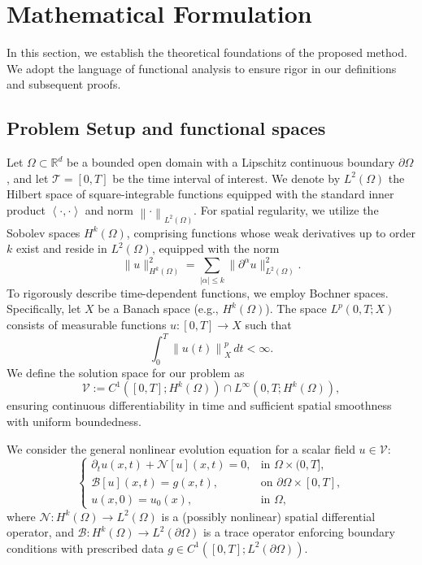 \documentclass[11pt,reqno]{amsart}
\theoremstyle{plain}
\theoremstyle{definition}
\theoremstyle{remark}
\newcommand{\norm}[1]{\left\|#1\right\|}
\newcommand{\inner}[2]{\left\langle #1, #2 \right\rangle}
\begin{document}
\section{Mathematical Formulation}

In this section, we establish the theoretical foundations of the proposed method. We adopt the language of functional analysis to ensure rigor in our definitions and subsequent proofs.

\subsection{Problem Setup and functional spaces}

Let $\Omega \subset \mathbb{R}^d$ be a bounded open domain with a Lipschitz continuous boundary $\partial \Omega$, and let $\mathcal{T} = [0, T]$ be the time interval of interest. We denote by $L^2(\Omega)$ the Hilbert space of square-integrable functions equipped with the standard inner product $\inner{\cdot}{\cdot}$ and norm $\norm{\cdot}_{L^2(\Omega)}$. For spatial regularity, we utilize the Sobolev spaces $H^k(\Omega)$, comprising functions whose weak derivatives up to order $k$ exist and reside in $L^2(\Omega)$, equipped with the norm
\[
\|u\|_{H^k(\Omega)}^2 = \sum_{|\alpha| \leq k} \|\partial^\alpha u\|_{L^2(\Omega)}^2.
\]
To rigorously describe time-dependent functions, we employ Bochner spaces. Specifically, let $X$ be a Banach space (e.g., $H^k(\Omega)$). The space $L^p(0, T; X)$ consists of measurable functions $u: [0, T] \to X$ such that 
\[
\int_0^T \norm{u(t)}_X^p \, dt < \infty.
\]
We define the solution space for our problem as 
\[
\mathcal{V} := C^1([0, T]; H^k(\Omega)) \cap L^\infty(0,T; H^k(\Omega)),
\]
ensuring continuous differentiability in time and sufficient spatial smoothness with uniform boundedness.

\medskip
\noindent We consider the general nonlinear evolution equation for a scalar field $u \in \mathcal{V}$:
\begin{equation} \label{eq:general_pde}
    \begin{cases}
        \partial_t u(x,t) + \mathcal{N}[u](x,t) = 0, & \text{in } \Omega \times (0, T], \\
        \mathcal{B}[u](x,t) = g(x,t), & \text{on } \partial \Omega \times [0, T], \\
        u(x,0) = u_0(x), & \text{in } \Omega,
    \end{cases}
\end{equation}
where $\mathcal{N}: H^k(\Omega) \to L^2(\Omega)$ is a (possibly nonlinear) spatial differential operator, and $\mathcal{B}: H^k(\Omega) \to L^2(\partial\Omega)$ is a trace operator enforcing boundary conditions with prescribed data $g \in C^1([0,T]; L^2(\partial\Omega))$.
\end{document}
